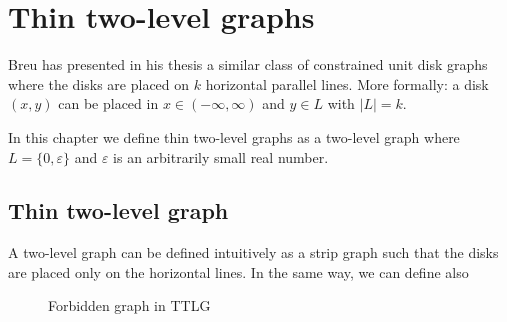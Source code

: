 \chapter{Thin two-level graphs}
\label{chap:twolevel}

Breu \cite{breuAlgorithmicAspectsConstrained1996} has presented in his thesis a similar class of constrained unit disk graphs where the disks are placed on $k$ horizontal parallel lines. More formally: a disk $(x,y)$ can be placed in $x \in (-\infty,\infty)$ and $y \in L$ with $|L| = k$.

In this chapter we define thin two-level graphs as a two-level graph where $L = \{0,\varepsilon\}$ and $\varepsilon$ is an arbitrarily small real number.


\section{Thin two-level graph}

A two-level graph can be defined intuitively as a strip graph such that the disks are placed only on the horizontal lines. In the same way,
we can define also

\begin{figure}
\centering

\begin{scaletikzpicturetowidth}{\textwidth}
\end{scaletikzpicturetowidth}

\caption{ Forbidden graph in TTLG }
\label{fig:forbSigma}
\end{figure}

